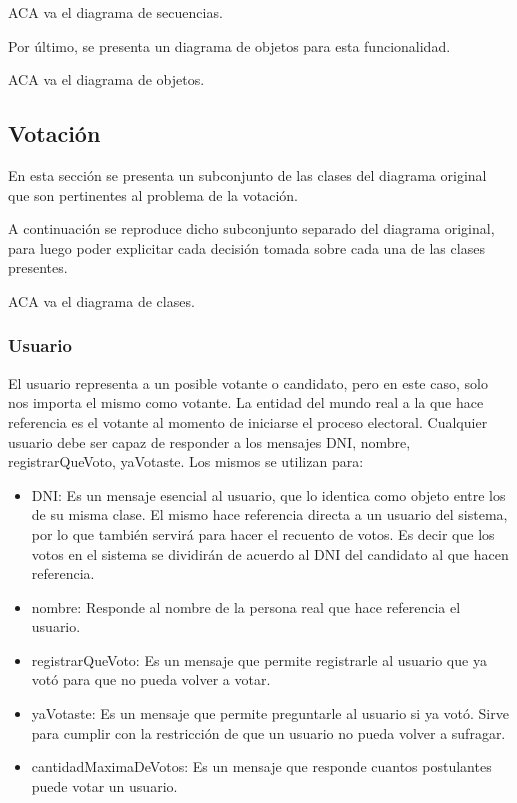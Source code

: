 ACA va el diagrama de secuencias.


\bigskip

Por \'ultimo, se presenta un diagrama de objetos para esta funcionalidad.

ACA va el diagrama de objetos.



\subsection{Votaci\'on}


En esta secci\'on se presenta un subconjunto de las clases del diagrama original que son pertinentes al problema de la votaci\'on.

A continuaci\'on se reproduce dicho subconjunto separado del diagrama original, para luego poder explicitar cada decisi\'on tomada sobre cada una de las clases presentes.

ACA va el diagrama de clases.

\subsubsection{Usuario}

El usuario representa a un posible votante o candidato, pero en este caso, solo nos importa el mismo como votante. La entidad del mundo real a la que hace referencia es el votante al momento de iniciarse el proceso electoral. Cualquier usuario debe ser capaz de responder a los mensajes DNI, nombre, registrarQueVoto, yaVotaste. Los mismos se utilizan para:

\begin{itemize}
\item DNI: Es un mensaje esencial al usuario, que lo identica como objeto entre los de su misma clase. El mismo hace referencia directa a un usuario del sistema, por lo que tambi\'en servir\'a para hacer el recuento de votos. Es decir que los votos en el sistema se dividir\'an de acuerdo al DNI del candidato al que hacen referencia.
\item nombre: Responde al nombre de la persona real que hace referencia el usuario.
\item registrarQueVoto: Es un mensaje que permite registrarle al usuario que ya vot\'o para que no pueda volver a votar.
\item yaVotaste: Es un mensaje que permite preguntarle al usuario si ya vot\'o. Sirve para cumplir con la restricci\'on de que un usuario no pueda volver a sufragar.
\item cantidadMaximaDeVotos: Es un mensaje que responde cuantos postulantes puede votar un usuario.
\end{itemize}

